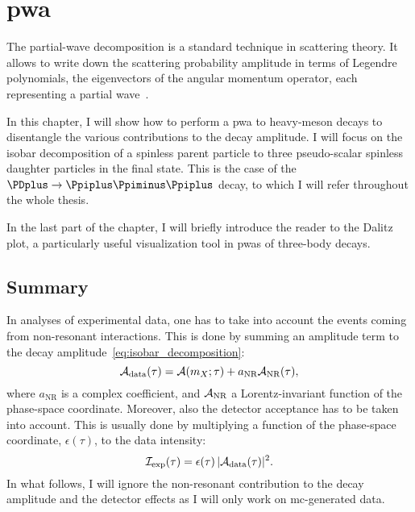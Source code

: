 \chapter{\texorpdfstring{\Acl{pwa}}{Partial-wave analysis}}
\label{chap:theory}

    The partial-wave decomposition is a standard technique in scattering theory.
    It allows to write down the scattering probability amplitude in terms of Legendre polynomials, the eigenvectors of the angular momentum operator, each representing a partial wave~\cite[\S~11.2]{griffiths_intro_qm}.


    In this chapter, I will show how to perform a \ac{pwa} to heavy-meson decays to disentangle the various contributions to the decay amplitude.
    I will focus on the isobar decomposition of a spinless parent particle to three pseudo-scalar spinless daughter particles in the final state.
    This is the case of the $\PDplus\to\Ppiplus\Ppiminus\Ppiplus$ decay, to which I will refer throughout the whole thesis.


    In the last part of the chapter, I will briefly introduce the reader to the Dalitz plot, a particularly useful visualization tool in \acp{pwa} of three-body decays.

    
    

    \section{Summary}

    In analyses of experimental data, one has to take into account the events coming from non-resonant interactions.
    This is done by summing an amplitude term to the decay amplitude~\eqref{eq:isobar_decomposition}:
    \begin{equation}
        \mathcal{A}_{\text{data}}(\tau) = \mathcal{A}(m_X;\tau) + a_{\text{NR}} \mathcal{A}_{\text{NR}}(\tau),
    \end{equation}
    where $a_{\text{NR}}$ is a complex coefficient, and $\mathcal{A}_{\text{NR}}$ a Lorentz-invariant function of the phase-space coordinate.
    Moreover, also the detector acceptance has to be taken into account.
    This is usually done by multiplying a function of the phase-space coordinate, $\epsilon(\tau)$, to the data intensity:
    \begin{equation}
        \mathcal{I}_{\text{exp}}(\tau) = \epsilon(\tau)\,\lvert\mathcal{A}_{\text{data}}(\tau)\rvert^2.
    \end{equation}
    In what follows, I will ignore the non-resonant contribution to the decay amplitude and the detector effects as I will only work on \ac{mc}-generated data.



